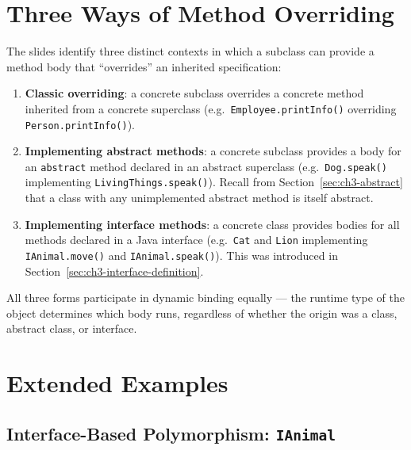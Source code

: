 \documentclass[11pt, a4paper, notitlepage]{report}
\theoremstyle{definition}
\theoremstyle{remark}
\theoremstyle{definition}
\begin{document}
\section{Three Ways of Method Overriding}
\label{sec:ch5-three-ways}

The slides identify three distinct contexts in which a subclass can provide a method body that ``overrides'' an inherited specification:

\begin{enumerate}
  \item \textbf{Classic overriding}: a concrete subclass overrides a concrete method inherited from a concrete superclass (e.g.\ \texttt{Employee.printInfo()} overriding \texttt{Person.printInfo()}).

  \item \textbf{Implementing abstract methods}: a concrete subclass provides a body for an \texttt{abstract} method declared in an abstract superclass (e.g.\ \texttt{Dog.speak()} implementing \texttt{LivingThings.speak()}).  Recall from Section~\ref{sec:ch3-abstract} that a class with any unimplemented abstract method is itself abstract.

  \item \textbf{Implementing interface methods}: a concrete class provides bodies for all methods declared in a Java interface (e.g.\ \texttt{Cat} and \texttt{Lion} implementing \texttt{IAnimal.move()} and \texttt{IAnimal.speak()}).  This was introduced in Section~\ref{sec:ch3-interface-definition}.
\end{enumerate}

All three forms participate in dynamic binding equally --- the runtime type of the object determines which body runs, regardless of whether the origin was a class, abstract class, or interface.

\section{Extended Examples}
\label{sec:ch5-examples}

\subsection{Interface-Based Polymorphism: \texttt{IAnimal}}
\label{sec:ch5-ianimal-example}
\end{document}
